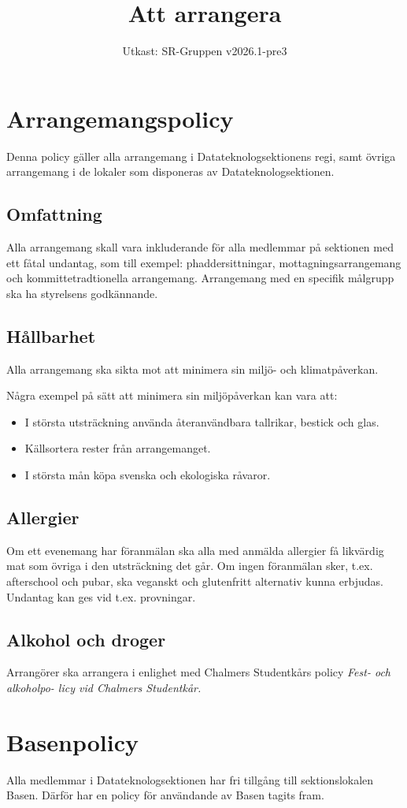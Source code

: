 \documentclass[a4paper]{dtek}
\title{Att arrangera}
\date{Utkast: SR-Gruppen v2026.1-pre3}
\begin{document}
\section{Arrangemangspolicy}
Denna policy gäller alla arrangemang i Datateknologsektionens regi, samt övriga arrangemang i de lokaler som disponeras av Datateknologsektionen.

\subsection{Omfattning}
Alla arrangemang skall vara inkluderande för alla medlemmar på sektionen med ett fåtal undantag, som till exempel: phaddersittningar, mottagningsarrangemang och kommittetradtionella arrangemang. Arrangemang med en specifik målgrupp ska ha styrelsens godkännande.

\subsection{Hållbarhet}
Alla arrangemang ska sikta mot att minimera sin miljö- och klimatpåverkan.

Några exempel på sätt att minimera sin miljöpåverkan kan vara att:
\begin{itemize}
    \item I största utsträckning använda återanvändbara tallrikar, bestick och glas.
    \item Källsortera rester från arrangemanget.
    \item I största mån köpa svenska och ekologiska råvaror.
\end{itemize}

\subsection{Allergier}
Om ett evenemang har föranmälan ska alla med anmälda allergier få likvärdig mat som övriga i den utsträckning det går. Om ingen föranmälan sker, t.ex. afterschool och pubar, ska veganskt och glutenfritt alternativ kunna erbjudas. Undantag kan ges vid t.ex. provningar.

\subsection{Alkohol och droger}
Arrangörer ska arrangera i enlighet med Chalmers Studentkårs policy \textit{Fest- och alkoholpo-
licy vid Chalmers Studentkår.}

\section{Basenpolicy}
Alla medlemmar i Datateknologsektionen har fri tillgång till sektionslokalen Basen. Därför har en policy för användande av Basen tagits fram.
\end{document}

